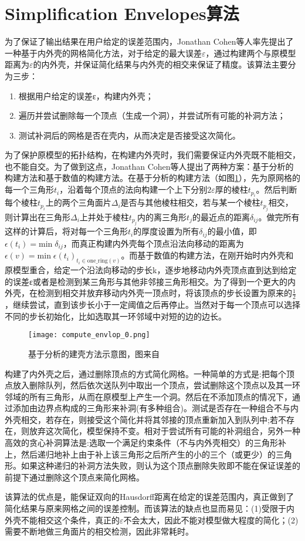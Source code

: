 \section{Simplification Envelopes算法}
为了保证了输出结果在用户给定的误差范围内，Jonathan Cohen等人率先提出了一种基于内外壳的网格简化方法\cite{simp-envlop}，对于给定的最大误差$\varepsilon$，通过构建两个与原模型距离为$\varepsilon$的内外壳，并保证简化结果与内外壳的相交来保证了精度。该算法主要分为三步：
\begin{enumerate}
  \item 根据用户给定的误差ε，构建内外壳；
  \item 遍历并尝试删除每一个顶点（生成一个洞），并尝试所有可能的补洞方法；
  \item 测试补洞后的网格是否在壳内，从而决定是否接受这次简化。
\end{enumerate}
为了保护原模型的拓扑结构，在构建内外壳时，我们需要保证内外壳既不能相交，也不能自交。为了做到这点，Jonathan Cohen等人提出了两种方案：基于分析的构建方法和基于数值的构建方法。在基于分析的构建方法（如图\ref{fig:compute-envlop0}），先为原网格的每一个三角形$t_i$，沿着每个顶点的法向构建一个上下分别$2\varepsilon$厚的棱柱$t_{p_i}$。然后判断每个棱柱$t_{p_i}$上的两个三角面片$\Delta_i$是否与其他棱柱相交，若与某一个棱柱$t_{p_j}$相交，则计算出在三角形$\Delta_i$上并处于棱柱$t_{p_j}$内的离三角形$t_j$的最近点的距离$\delta_{ij}$。做完所有这样的计算后，将对每一个三角形$t_i$的厚度设置为所有$\delta_{ij}$的最小值，即$\epsilon(t_i) = \text{min} \; \delta_{ij}$，而真正构建内外壳每个顶点沿法向移动的距离为$\epsilon(v) = \text{min} \; \epsilon(t_i)_{t_i \in  \text{one\_ring}(v)}$。而基于数值的构建方法，在刚开始时内外壳和原模型重合，给定一个沿法向移动的步长k，逐步地移动内外壳顶点直到达到给定的误差ε或者是检测到某三角形与其他非邻接三角形相交。为了得到一个更大的内外壳，在检测到相交并放弃移动内外壳一顶点时，将该顶点的步长设置为原来的$\frac{1}{2}$，继续尝试，直到该步长小于一定阈值之后再停止。当然对于每一个顶点可以选择不同的步长初始化，比如选取其一环邻域中对短的边的边长。\par
\begin{figure}[htbp]
    \centering
    \texttt{[image: compute\_envlop\_0.png]}
    \caption{基于分析的建壳方法示意图，图来自\cite{simp-envlop}}
    \label{fig:compute-envlop0}
\end{figure}
构建了内外壳之后，通过删除顶点的方式简化网格。一种简单的方式是:把每个顶点放入删除队列，然后依次送队列中取出一个顶点，尝试删除这个顶点以及其一环邻域的所有三角形，从而在原模型上产生一个洞。然后在不添加顶点的情况下，通过添加由边界点构成的三角形来补洞(有多种组合)。测试是否存在一种组合不与内外壳相交，若存在，则接受这个简化并将其邻接的顶点重新加入到队列中;若不存在，则放弃这次简化，模型保持不变。相对于尝试所有可能的补洞组合，另外一种高效的贪心补洞算法是:选取一个满足约束条件（不与内外壳相交）的三角形补上，然后递归地补上由于补上该三角形之后所产生的小的三个（或更少）的三角形。如果这种递归的补洞方法失败，则认为这个顶点删除失败即不能在保证误差的前提下通过删除这个顶点来简化网格。\par
该算法的优点是，能保证双向的Hausdorff距离在给定的误差范围内，真正做到了简化结果与原来网格之间的误差控制。而该算法的缺点也显而易见：(1)受限于内外壳不能相交这个条件，真正的$\varepsilon$不会太大，因此不能对模型做大程度的简化；(2)需要不断地做三角面片的相交检测，因此非常耗时。


